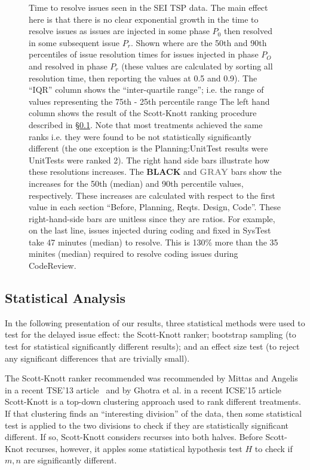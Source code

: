 \documentclass[smallcondensed]{svjour3}
\newcommand{\tion}[1]{\S\ref{sect:#1}}
\begin{document}
\begin{figure}
\begin{center}
\end{center}
\caption{Time to resolve issues seen in the SEI TSP data. The main effect here is that there is no clear exponential growth in the time to resolve issues as issues are injected in some phase $P_0$ then resolved in some subsequent issue $P_r$.
Shown where are the 50th and 90th percentiles of issue resolution times for issues injected in phase $P_O$ and resolved in phase $P_r$ (these values are calculated
by sorting all resolution time, then reporting the values at 0.5 and 0.9).
The ``IQR'' column shows the ``inter-quartile range''; i.e. the range of values representing the 75th - 25th percentile range
The left hand column shows the result of the Scott-Knott ranking procedure described in \tion{stats}. Note that
most treatments achieved the same ranks i.e. they were found to be not statistically significantly different  (the one exception is the Planning:UnitTest results were UnitTests were ranked 2).
The right hand side bars
illustrate how these resolutions increases.
The {\bf BLACK} and \textcolor{Gray}{{\bf GRAY}} bars show the increases for the  50th (median) and 90th percentile values, respectively. These increases are calculated with respect to the first value in each section ``Before, Planning, Reqts. Design, Code''.
These right-hand-side bars are unitless since they are ratios. For example,
on the last line, issues injected during coding and fixed in SysTest take 47 minutes (median) to resolve. This is 130\% more than the 35 minites (median) required
to resolve coding issues during CodeReview.}
\label{fig:raw}
\end{figure}


\subsection{Statistical Analysis}\label{sect:stats}
    
    In the following presentation of our results, three statistical methods were used to test for the delayed
    issue effect: the Scott-Knott ranker;   bootstrap sampling (to test for statistical significantly
    different results); and an effect size test (to reject any significant differences that are trivially small).
    
    The Scott-Knott ranker 
    recommended was   recommended  by  Mittas and Angelis in a
    recent TSE'13 article~\cite{mittas13} and by Ghotra et al. in a recent
    ICSE'15 article~\cite{ghotra2015icse}
    Scott-Knott is a 
    top-down clustering approach used to rank different treatments. If that 
    clustering finds an ``interesting division'' of the data, then some 
    statistical test is applied to the two divisions to check if they are 
    statistically significant different. If so, Scott-Knott considers recurses into both 
    halves.
    Before Scott-Knot recurses,  however,  it apples some  statistical hypothesis test $H$ to check
    if $m,n$ are significantly different. 
    
\end{document}
